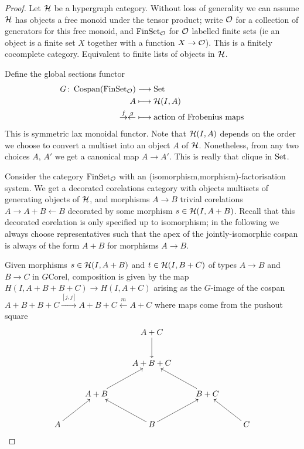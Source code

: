 \begin{proof}
  Let $\mathcal H$ be a hypergraph category. Without loss of generality we can assume
  $\mathcal H$ has objects a free monoid under the tensor product; write $\mathcal O$ for
  a collection of generators for this free monoid, and $\mathrm{FinSet}_{\mathcal O}$ for
  $\mathcal O$ labelled finite sets (ie an object is a finite set $X$ together with a
  function $X \to \mathcal O$). This is a finitely cocomplete category. Equivalent to
  finite lists of objects in $\mathcal H$. 

  Define the global sections functor 
  \begin{align*}
    G{\colon} \operatorname{{Cospan}}(\mathrm{FinSet}_{\mathcal O}) &\longrightarrow \mathrm{Set} \\
    A &\longmapsto \mathcal H(I,A) \\
    \stackrel{f}{\to}\stackrel{g}{\leftarrow} &\longmapsto \textrm{action of
    Frobenius maps}
  \end{align*}
  This is symmetric lax monoidal functor. Note that $\mathcal H(I,A)$ depends on the
  order we choose to convert a multiset into an object $A$ of $\mathcal H$.
  Nonetheless, from any two choices $A$, $A'$ we get a canonical map $A \to A'$.
  This is really that clique in $\mathrm{Set}$.

  Consider the category $\mathrm{FinSet}_{\mathcal O}$ with an
  (isomorphism,morphism)-factorisation system. We get a decorated corelations
  category with objects multisets of generating objects of $\mathcal H$, and morphisms $A \to
  B$ trivial corelations $A \to A+B \leftarrow B$ decorated by some morphism
  $s \in \mathcal H(I,A+B)$. Recall that this decorated corelation is only specified
  up to isomorphism; in the following we always choose representatives such that
  the apex of the jointly-isomorphic cospan is always of the form $A+B$ for
  morphisms $A \to B$.
  
  Given morphisms $s \in \mathcal H(I,A+B)$ and $t \in \mathcal H(I,B+C)$ of types $A \to
  B$ and $B \to C$ in $G\mathrm{Corel}$, composition is given by the map
  $H(I,A+B+B+C) \to H(I,A+C)$ arising as the $G$-image of the cospan $A+B+B+C
  \stackrel{[j,j]}\rightarrow A+B+C \stackrel{m}\leftarrow A+C$ where maps come
  from the pushout square
  \[
    \xymatrix{
      && A+C \ar[d] \\
      && A+B+C \\
      & A+B \ar[ur] && B+C \ar[ul] \\
      A \ar[ur] && B \ar[ul]\ar[ur] && C \ar[ul]
    }
  \]
  

\end{proof}
